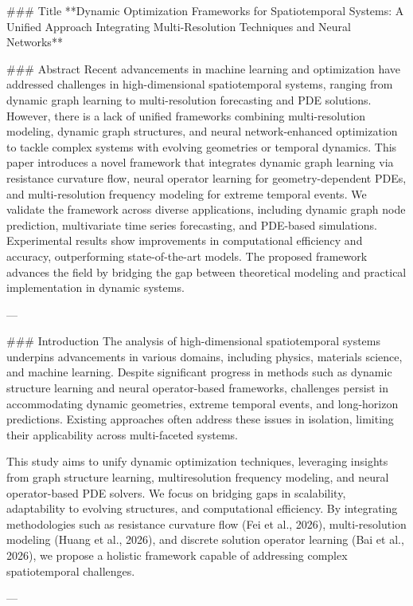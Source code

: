 ### Title
**Dynamic Optimization Frameworks for Spatiotemporal Systems: A Unified Approach Integrating Multi-Resolution Techniques and Neural Networks**

### Abstract
Recent advancements in machine learning and optimization have addressed challenges in high-dimensional spatiotemporal systems, ranging from dynamic graph learning to multi-resolution forecasting and PDE solutions. However, there is a lack of unified frameworks combining multi-resolution modeling, dynamic graph structures, and neural network-enhanced optimization to tackle complex systems with evolving geometries or temporal dynamics. This paper introduces a novel framework that integrates dynamic graph learning via resistance curvature flow, neural operator learning for geometry-dependent PDEs, and multi-resolution frequency modeling for extreme temporal events. We validate the framework across diverse applications, including dynamic graph node prediction, multivariate time series forecasting, and PDE-based simulations. Experimental results show improvements in computational efficiency and accuracy, outperforming state-of-the-art models. The proposed framework advances the field by bridging the gap between theoretical modeling and practical implementation in dynamic systems.

---

### Introduction
The analysis of high-dimensional spatiotemporal systems underpins advancements in various domains, including physics, materials science, and machine learning. Despite significant progress in methods such as dynamic structure learning and neural operator-based frameworks, challenges persist in accommodating dynamic geometries, extreme temporal events, and long-horizon predictions. Existing approaches often address these issues in isolation, limiting their applicability across multi-faceted systems.

This study aims to unify dynamic optimization techniques, leveraging insights from graph structure learning, multiresolution frequency modeling, and neural operator-based PDE solvers. We focus on bridging gaps in scalability, adaptability to evolving structures, and computational efficiency. By integrating methodologies such as resistance curvature flow (Fei et al., 2026), multi-resolution modeling (Huang et al., 2026), and discrete solution operator learning (Bai et al., 2026), we propose a holistic framework capable of addressing complex spatiotemporal challenges.

---

